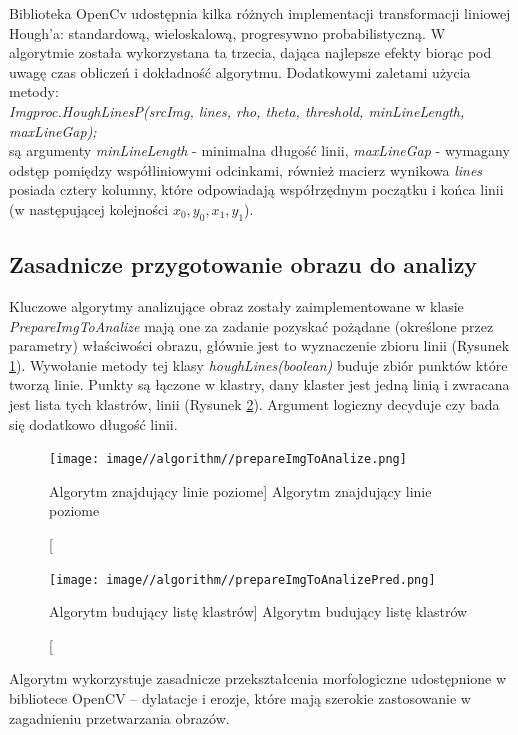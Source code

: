 \documentclass[a4paper,12pt]{article}
\newcommand\spacingIndent{2.2em}
\begin{document}
		        Biblioteka OpenCv udostępnia kilka różnych implementacji transformacji liniowej Hough'a: standardową, wieloskalową, progresywno probabilistyczną.
		        W algorytmie została wykorzystana ta trzecia, dająca najlepsze efekty biorąc pod uwagę czas obliczeń i dokładność algorytmu. Dodatkowymi zaletami użycia metody:\\ \textit {Imgproc.HoughLinesP(srcImg, lines, rho, theta, threshold, minLineLength, maxLineGap);}\\
		        są argumenty \textit{minLineLength} - minimalna długość linii, \textit{maxLineGap} - wymagany odstęp pomiędzy współliniowymi odcinkami, również macierz wynikowa \textit{lines} posiada cztery kolumny, które odpowiadają współrzędnym początku i końca linii (w następującej kolejności $ x_0, y_0, x_1, y_1 $).
		
		\subsection{Zasadnicze przygotowanie obrazu do analizy}
	        \hspace{\spacingIndent} 
	        Kluczowe algorytmy analizujące obraz zostały zaimplementowane w klasie \textit{PrepareImgToAnalize} mają one za zadanie pozyskać pożądane (określone przez parametry) właściwości obrazu, głównie jest to wyznaczenie zbioru     linii (Rysunek \ref{fig:searchHorizontalLine}). Wywołanie metody tej klasy \textit{houghLines(boolean)} buduje zbiór          punktów  które tworzą linie. Punkty są łączone w klastry, dany klaster      jest jedną linią i zwracana jest lista tych klastrów, linii (Rysunek \ref{fig:makeClaster}). Argument       logiczny decyduje czy bada się dodatkowo długość linii.
    		    
    			\begin{figure}[!ht]  
    		        \begin{center}
    		    	    \texttt{[image: image//algorithm//prepareImgToAnalize.png]} 
    			    \end{center}
    		    	\caption
        	    		[Algorytm znajdujący linie poziome]  
            			{Algorytm znajdujący linie poziome}  
            			\label{fig:searchHorizontalLine}
    		    \end{figure}	
				
    			\begin{figure}[!ht]  
    		        \begin{center}
    		    	    \texttt{[image: image//algorithm//prepareImgToAnalizePred.png]} 
    			    \end{center}
        			\caption
        			    [Algorytm budujący listę klastrów]  
            			{Algorytm budujący listę klastrów}  \label{fig:makeClaster}
    		    \end{figure}
		        \newpage
		        Algorytm wykorzystuje zasadnicze przekształcenia morfologiczne udostępnione w bibliotece OpenCV -- dylatacje i erozje, które mają szerokie zastosowanie w zagadnieniu przetwarzania obrazów. 
		        
\end{document}
